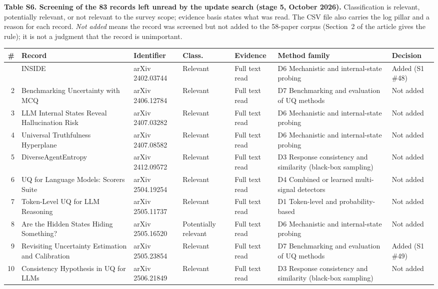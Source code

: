\documentclass[acmsmall]{acmart}
\begin{document}
\clearpage
\noindent\textbf{Table S6. Screening of the 83 records left unread by the update search (stage 5, October 2026).} Classification is relevant, potentially relevant, or not relevant to the survey scope; evidence basis states what was read. The CSV file also carries the log pillar and a reason for each record. \emph{Not added} means the record was screened but not added to the 58-paper corpus (Section~2 of the article gives the rule); it is not a judgment that the record is unimportant.
\begin{center}
\tiny
\begin{longtable}{@{}r p{3.0cm} p{2.0cm} p{1.5cm} p{2.3cm} p{2.6cm} p{1.2cm}@{}}
\toprule
\# & Record & Identifier & Class. & Evidence & Method family & Decision \\
\midrule
\endhead
\bottomrule
\endfoot
1 & INSIDE & arXiv 2402.03744 & Relevant & Full text read & D6 Mechanistic and internal-state probing & Added (S1 \#48) \\
2 & Benchmarking Uncertainty with MCQ & arXiv 2406.12784 & Relevant & Full text read & D7 Benchmarking and evaluation of UQ methods & Not added \\
3 & LLM Internal States Reveal Hallucination Risk & arXiv 2407.03282 & Relevant & Full text read & D6 Mechanistic and internal-state probing & Not added \\
4 & Universal Truthfulness Hyperplane & arXiv 2407.08582 & Relevant & Full text read & D6 Mechanistic and internal-state probing & Not added \\
5 & DiverseAgentEntropy & arXiv 2412.09572 & Relevant & Full text read & D3 Response consistency and similarity (black-box sampling) & Not added \\
6 & UQ for Language Models: Scorers Suite & arXiv 2504.19254 & Relevant & Full text read & D4 Combined or learned multi-signal detectors & Not added \\
7 & Token-Level UQ for LLM Reasoning & arXiv 2505.11737 & Relevant & Full text read & D1 Token-level and probability-based & Not added \\
8 & Are the Hidden States Hiding Something? & arXiv 2505.16520 & Potentially relevant & Full text read & D6 Mechanistic and internal-state probing & Not added \\
9 & Revisiting Uncertainty Estimation and Calibration & arXiv 2505.23854 & Relevant & Full text read & D7 Benchmarking and evaluation of UQ methods & Added (S1 \#49) \\
10 & Consistency Hypothesis in UQ for LLMs & arXiv 2506.21849 & Relevant & Full text read & D3 Response consistency and similarity (black-box sampling) & Not added \\

\end{longtable}
\end{center}
\end{document}
